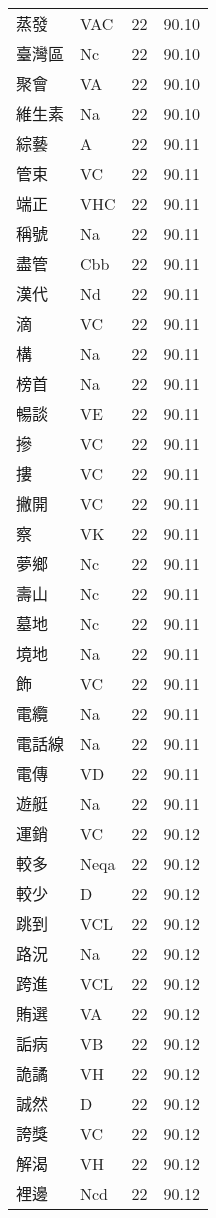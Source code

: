 \documentclass[twocolumn]{book}
\begin{document}
\begin{supertabular}{llrr}
蒸發 & VAC & 22 &  90.10\\
臺灣區 & Nc & 22 &  90.10\\
聚會 & VA & 22 &  90.10\\
維生素 & Na & 22 &  90.10\\
綜藝 & A & 22 &  90.11\\
管束 & VC & 22 &  90.11\\
端正 & VHC & 22 &  90.11\\
稱號 & Na & 22 &  90.11\\
盡管 & Cbb & 22 &  90.11\\
漢代 & Nd & 22 &  90.11\\
滴 & VC & 22 &  90.11\\
構 & Na & 22 &  90.11\\
榜首 & Na & 22 &  90.11\\
暢談 & VE & 22 &  90.11\\
摻 & VC & 22 &  90.11\\
摟 & VC & 22 &  90.11\\
撇開 & VC & 22 &  90.11\\
察 & VK & 22 &  90.11\\
夢鄉 & Nc & 22 &  90.11\\
壽山 & Nc & 22 &  90.11\\
墓地 & Nc & 22 &  90.11\\
境地 & Na & 22 &  90.11\\
飾 & VC & 22 &  90.11\\
電纜 & Na & 22 &  90.11\\
電話線 & Na & 22 &  90.11\\
電傳 & VD & 22 &  90.11\\
遊艇 & Na & 22 &  90.11\\
運銷 & VC & 22 &  90.12\\
較多 & Neqa & 22 &  90.12\\
較少 & D & 22 &  90.12\\
跳到 & VCL & 22 &  90.12\\
路況 & Na & 22 &  90.12\\
跨進 & VCL & 22 &  90.12\\
賄選 & VA & 22 &  90.12\\
詬病 & VB & 22 &  90.12\\
詭譎 & VH & 22 &  90.12\\
誠然 & D & 22 &  90.12\\
誇獎 & VC & 22 &  90.12\\
解渴 & VH & 22 &  90.12\\
裡邊 & Ncd & 22 &  90.12\\

\end{supertabular}
\end{document}
